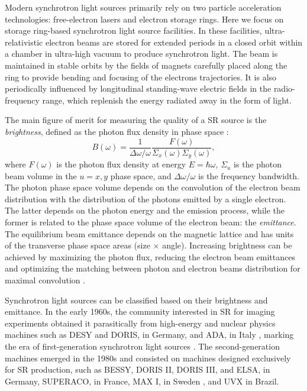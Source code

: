 Modern synchrotron light sources primarily rely on two particle acceleration technologies: free-electron lasers and electron storage rings. Here we focus on storage ring-based synchrotron light source facilities. In these facilities, ultra-relativistic electron beams are stored for extended periods in a closed orbit within a chamber in ultra-high vacuum to produce synchrotron light. The beam is maintained in stable orbits by the fields of magnets carefully placed along the ring to provide bending and focusing of the electrons trajectories. It is also periodically influenced by longitudinal standing-wave electric fields in the radio-frequency range, which replenish the energy radiated away in the form of light.

The main figure of merit for measuring the quality of a SR source is the \textit{brightness}\cite{huang_brightness_2013}, defined as the photon flux density in phase space \cite{hettel_challenges_2014}:
\begin{equation}
    B(\omega) = \frac{1}{\Delta \omega/\omega}\frac{F(\omega)}{\Sigma_{x}(\omega)\Sigma_{y}(\omega)},
\end{equation}
where $F(\omega)$ is the photon flux density at energy $E=\hbar\omega$, $\Sigma_{u}$ is the photon beam volume in the $u=x,y$ phase space, and $\Delta\omega/\omega$ is the frequency bandwidth. The photon phase space volume depends on the convolution of the electron beam distribution with the distribution of the photons emitted by a single electron. The latter depends on the photon energy and the emission process, while the former is related to the phase space volume of the electron beam: the \textit{emittance}. The equilibrium beam emittance depends on the magnetic lattice and has units of the transverse phase space areas (size $\times$ angle). Increasing brightness can be achieved by maximizing the photon flux, reducing the electron beam emittances and optimizing the matching between photon and electron beams distribution for maximal convolution \cite{wiedemann_particle_2015}.

Synchrotron light sources can be classified based on their brightness and emittance. In the early 1960s, the community interested in SR for imaging experiments obtained it parasitically from high-energy and nuclear physics machines such as DESY and DORIS, in Germany, and ADA, in Italy \cite{simoulin_synchrotron_2016}, marking the era of first-generation synchrotron light sources \cite{liu_towards_2017}. The second-generation machines emerged in the 1980s and consisted on machines designed exclusively for SR production, such as BESSY, DORIS II, DORIS III,  and ELSA, in Germany, SUPERACO, in France, MAX I, in Sweden \cite{simoulin_synchrotron_2016}, and UVX in Brazil.

